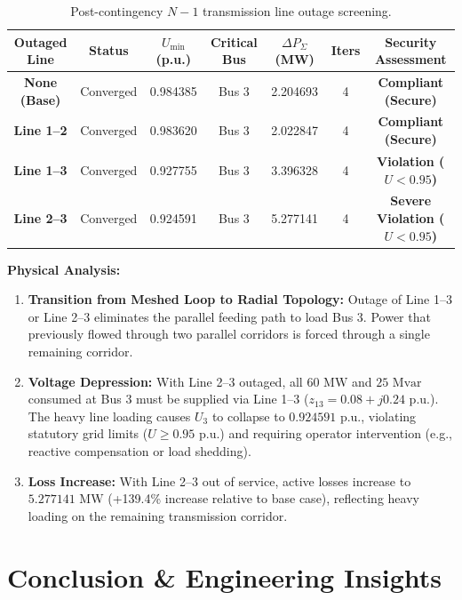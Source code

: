 \documentclass[12pt,a4paper,oneside]{report}
\begin{document}
\begin{table}[H]
\centering
\caption{Post-contingency $N-1$ transmission line outage screening.}
\label{tab:scenario4}
\begin{tabular}{ccccccc}
\toprule
\textbf{Outaged Line} & \textbf{Status} & \textbf{$U_{\min}$ (p.u.)} & \textbf{Critical Bus} & \textbf{$\Delta P_{\Sigma}$ (MW)} & \textbf{Iters} & \textbf{Security Assessment} \\
\midrule
\textbf{None (Base)} & Converged & 0.984385 & Bus 3 & 2.204693 & 4 & \textbf{Compliant (Secure)} \\
\textbf{Line 1--2} & Converged & 0.983620 & Bus 3 & 2.022847 & 4 & \textbf{Compliant (Secure)} \\
\textbf{Line 1--3} & Converged & 0.927755 & Bus 3 & 3.396328 & 4 & \textbf{Violation ($U < 0.95$)} \\
\textbf{Line 2--3} & Converged & 0.924591 & Bus 3 & 5.277141 & 4 & \textbf{Severe Violation ($U < 0.95$)} \\
\bottomrule
\end{tabular}
\end{table}

\textbf{Physical Analysis:}
\begin{enumerate}
    \item \textbf{Transition from Meshed Loop to Radial Topology:} Outage of Line 1--3 or Line 2--3 eliminates the parallel feeding path to load Bus 3. Power that previously flowed through two parallel corridors is forced through a single remaining corridor.
    \item \textbf{Voltage Depression:} With Line 2--3 outaged, all $60\text{ MW}$ and $25\text{ Mvar}$ consumed at Bus 3 must be supplied via Line 1--3 ($z_{13} = 0.08 + j0.24\text{ p.u.}$). The heavy line loading causes $U_3$ to collapse to $0.924591\text{ p.u.}$, violating statutory grid limits ($U \ge 0.95\text{ p.u.}$) and requiring operator intervention (e.g., reactive compensation or load shedding).
    \item \textbf{Loss Increase:} With Line 2--3 out of service, active losses increase to $5.277141\text{ MW}$ (+139.4\% increase relative to base case), reflecting heavy loading on the remaining transmission corridor.
\end{enumerate}

\chapter{Conclusion \& Engineering Insights}
\end{document}
